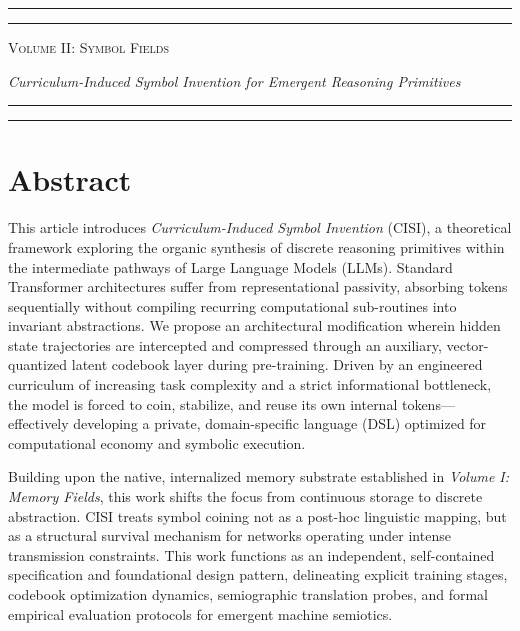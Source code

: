 \begin{titlepage}
    \thispagestyle{empty}
    
    \vfill
    \begin{center}
        \rule{\textwidth}{1.6pt}\vspace*{-\baselineskip}\vspace*{2pt}
        \rule{\textwidth}{0.4pt}\par\vspace{\baselineskip}
        {\Huge \scshape Volume II: Symbol Fields}\par\vspace{0.2in}
        {\Large \itshape Curriculum-Induced Symbol Invention for Emergent Reasoning Primitives}\par\vspace{3.2pt}
        \rule{\textwidth}{0.4pt}\vspace*{-\baselineskip}\vspace{3.2pt}
        \rule{\textwidth}{1.6pt}
    \end{center}
    \vfill
\end{titlepage}

\chapter*{Abstract}
This article introduces \textit{Curriculum-Induced Symbol Invention} (CISI), a theoretical framework exploring the organic synthesis of discrete reasoning primitives within the intermediate pathways of Large Language Models (LLMs). Standard Transformer architectures suffer from representational passivity, absorbing tokens sequentially without compiling recurring computational sub-routines into invariant abstractions. We propose an architectural modification wherein hidden state trajectories are intercepted and compressed through an auxiliary, vector-quantized latent codebook layer during pre-training. Driven by an engineered curriculum of increasing task complexity and a strict informational bottleneck, the model is forced to coin, stabilize, and reuse its own internal tokens—effectively developing a private, domain-specific language (DSL) optimized for computational economy and symbolic execution. 

Building upon the native, internalized memory substrate established in \textit{Volume I: Memory Fields}, this work shifts the focus from continuous storage to discrete abstraction. CISI treats symbol coining not as a post-hoc linguistic mapping, but as a structural survival mechanism for networks operating under intense transmission constraints. This work functions as an independent, self-contained specification and foundational design pattern, delineating explicit training stages, codebook optimization dynamics, semiographic translation probes, and formal empirical evaluation protocols for emergent machine semiotics.

